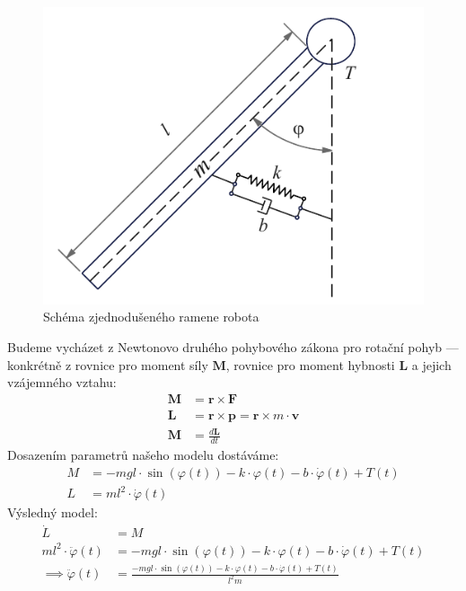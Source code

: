 \begin{figure}[H]
    \centering
    \includegraphics{Img/Drawing.pdf}
    \caption{Schéma zjednodušeného ramene robota}
    \label{fig:1 DoF schéma robota}
\end{figure}
Budeme vycházet z Newtonovo druhého pohybového zákona pro rotační pohyb --- konkrétně z rovnice pro moment síly $\bm{M}$, rovnice pro moment hybnosti $\bm{L}$
a jejich vzájemného vztahu:
\begin{align}
    \bm{M} & = \bm{r}\times\bm{F}                             \\
    \bm{L} & = \bm{r}\times\bm{p} = \bm{r}\times m\cdot\bm{v} \\
    \bm{M} & = \frac{d\bm{L}}{dt}
\end{align}
Dosazením parametrů našeho modelu dostáváme:
\begin{align}
    M & = -mgl\cdot\sin(\varphi(t)) -k\cdot\varphi(t) - b \cdot\dot{\varphi}(t) + T(t) \\
    L & =  ml^2\cdot\dot\varphi(t)
\end{align}
Výsledný model:
\begin{align}
    \dot{L}                    & =  M                                                                                        \\
    ml^2\cdot\ddot\varphi(t)   & = -mgl\cdot\sin(\varphi(t)) -k\cdot\varphi(t) - b \cdot\dot{\varphi}(t) + T(t)              \\
    \implies \ddot{\varphi}(t) & =  \frac{- mgl\cdot\sin(\varphi(t)) - k\cdot\varphi(t) -b\cdot\dot\varphi(t) + T(t)}{l^2m }
\end{align}
